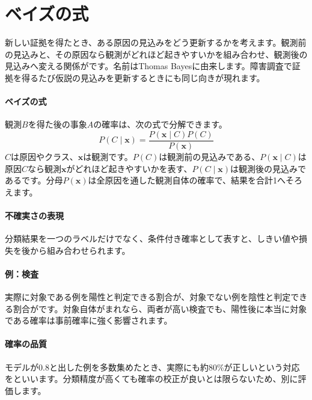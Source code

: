 \par
\endgroup
\par
\endgroup


\section{ベイズの式}
\label{sec:06-machine-learning-12}

新しい証拠を得たとき、ある原因の見込みをどう更新するかを考えます。観測前の見込みと、その原因なら観測がどれほど起きやすいかを組み合わせ、観測後の見込みへ変える関係がです。名前はThomas Bayesに由来します。障害調査で証拠を得るたび仮説の見込みを更新するときにも同じ向きが現れます。

\begingroup
\begingroup
\paragraph{ベイズの式}
        観測$B$を得た後の事象$A$の確率は、次の式で分解できます。
        \[
          P(C\mid\mathbf{x})=
          \frac{P(\mathbf{x}\mid C)P(C)}
               {P(\mathbf{x})}
        \]
        $C$は原因やクラス、$\mathbf{x}$は観測です。$P(C)$は観測前の見込みである、$P(\mathbf{x}\mid C)$は原因$C$なら観測$\mathbf{x}$がどれほど起きやすいかを表す、$P(C\mid\mathbf{x})$は観測後の見込みであるです。分母$P(\mathbf{x})$は全原因を通した観測自体の確率で、結果を合計1へそろえます。

\paragraph{不確実さの表現}
        分類結果を一つのラベルだけでなく、条件付き確率として表すと、しきい値や損失を後から組み合わせられます。

\par
\endgroup
\medskip
\begingroup
\paragraph{例：検査}
        実際に対象である例を陽性と判定できる割合が、対象でない例を陰性と判定できる割合がです。対象自体がまれなら、両者が高い検査でも、陽性後に本当に対象である確率は事前確率に強く影響されます。

\paragraph{確率の品質}
        モデルが0.8と出した例を多数集めたとき、実際にも約80\%が正しいという対応をといいます。分類精度が高くても確率の校正が良いとは限らないため、別に評価します。

